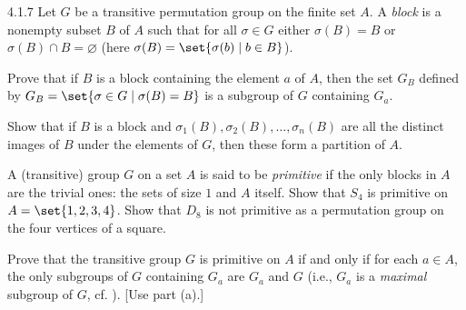 \begin{spex}{4.1.7}
	Let $G$ be a transitive permutation group on the finite set $A$.
	A \emph{block} is a nonempty subset $B$ of $A$ such that for all $\sigma \in G$ either $\sigma(B) = B$ or $\sigma(B) \cap B = \varnothing$ (here $\sigma(B) = \set{\sigma(b) \mid b \in B}$). 
	\begin{subexercises}
		\item Prove that if $B$ is a block containing the element $a$ of $A$, then the set $G_B$ defined by $G_B = \set{\sigma \in G \mid \sigma(B) = B}$ is a subgroup of $G$ containing $G_a$.
		\item Show that if $B$ is a block and $\sigma_1(B), \sigma_2(B), \ldots, \sigma_n(B)$ are all the distinct images of $B$ under the elements of $G$, then these form a partition of $A$.
		\item A (transitive) group $G$ on a set $A$ is said to be \emph{primitive} if the only blocks in $A$ are the trivial ones: the sets of size $1$ and $A$ itself.
		Show that $S_4$ is primitive on $A = \set{1,2,3,4}$.
		Show that $D_8$ is not primitive as a permutation group on the four vertices of a square.
		\item Prove that the transitive group $G$ is primitive on $A$ if and only if for each $a \in A$, the only subgroups of $G$ containing $G_a$ are $G_a$ and $G$ (i.e., $G_a$ is a \emph{maximal} subgroup of $G$, cf. ). [Use part (a).]
	\end{subexercises}
\end{spex}

